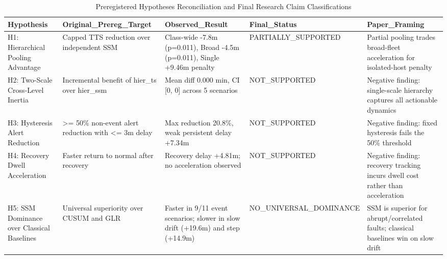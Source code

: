 \begin{table}[htbp]
\centering
\caption{Preregistered Hypotheses Reconciliation and Final Research Claim Classifications}
\label{tab:table_T11_hypothesis_reconciliation}
\begin{tabular}{lllll}
\hline
Hypothesis & Original\_Prereg\_Target & Observed\_Result & Final\_Status & Paper\_Framing \\
\hline
H1: Hierarchical Pooling Advantage & Capped TTS reduction over independent SSM & Class-wide -7.8m (p=0.011), Broad -4.5m (p=0.011), Single +9.46m penalty & PARTIALLY\_SUPPORTED & Partial pooling trades broad-fleet acceleration for isolated-host penalty \\
H2: Two-Scale Cross-Level Inertia & Incremental benefit of hier\_ts over hier\_ssm & Mean diff 0.000 min, CI [0, 0] across 5 scenarios & NOT\_SUPPORTED & Negative finding: single-scale hierarchy captures all actionable dynamics \\
H3: Hysteresis Alert Reduction & >= 50\% non-event alert reduction with <= 3m delay & Max reduction 20.8\%, weak persistent delay +7.34m & NOT\_SUPPORTED & Negative finding: fixed hysteresis fails the 50\% threshold \\
H4: Recovery Dwell Acceleration & Faster return to normal after recovery & Recovery delay +4.81m; no acceleration observed & NOT\_SUPPORTED & Negative finding: recovery tracking incurs dwell cost rather than acceleration \\
H5: SSM Dominance over Classical Baselines & Universal superiority over CUSUM and GLR & Faster in 9/11 event scenarios; slower in slow drift (+19.6m) and step (+14.9m) & NO\_UNIVERSAL\_DOMINANCE & SSM is superior for abrupt/correlated faults; classical baselines win on slow drift \\
\hline
\end{tabular}
\end{table}
